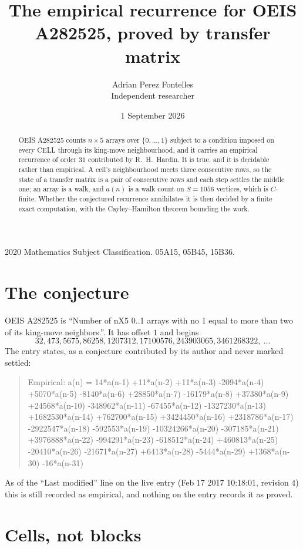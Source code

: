 \documentclass[11pt,a4paper]{article}
\title{The empirical recurrence for OEIS A282525, proved by transfer matrix}
\author{Adrian Perez Fontelles\\ \small Independent researcher}
\date{1 September 2026}
\theoremstyle{plain}
\theoremstyle{definition}
\begin{document}
\maketitle

\begin{abstract}
OEIS A282525 counts $n\times5$ arrays over $\{0,\dots,1\}$ subject to a condition imposed on
every CELL through its king-move neighbourhood, and it carries an empirical recurrence of
order $31$ contributed by R.~H.~Hardin. It is true, and it is decidable rather than
empirical. A cell's neighbourhood meets three consecutive rows, so the state of a transfer
matrix is a pair of consecutive rows and each step settles the middle one; an array is a
walk, and $a(n)$ is a walk count on $S=1056$ vertices, which is $C$-finite. Whether the
conjectured recurrence annihilates it is then decided by a finite exact computation, with the
Cayley--Hamilton theorem bounding the work.
\end{abstract}

\noindent\small 2020 Mathematics Subject Classification. 05A15, 05B45, 15B36.\normalsize

\section{The conjecture}

OEIS A282525 is ``Number of nX5 0..1 arrays with no 1 equal to more than two of its king-move neighbors.''. It has offset $1$ and begins
\[
32, 473, 5675, 86258, 1207312, 17100576, 243903065, 3461268322,\ \dots
\]
The entry states, as a conjecture contributed by its author and never marked settled:
\begin{quote}
Empirical: a(n) = 14*a(n-1) +11*a(n-2) +11*a(n-3) -2094*a(n-4) +5070*a(n-5) -8140*a(n-6) +28850*a(n-7) -16179*a(n-8) +37380*a(n-9) +24568*a(n-10) -348962*a(n-11) -67455*a(n-12) -1327230*a(n-13) +1682530*a(n-14) +762700*a(n-15) +3424450*a(n-16) +2318786*a(n-17) -2922547*a(n-18) -592553*a(n-19) -10324266*a(n-20) -307185*a(n-21) +3976888*a(n-22) -994291*a(n-23) -618512*a(n-24) +460813*a(n-25) -20410*a(n-26) -21671*a(n-27) +6413*a(n-28) -5444*a(n-29) +1368*a(n-30) -16*a(n-31)
\end{quote}
As of the ``Last modified'' line on the live entry (Feb 17 2017 10:18:01, revision 4) this is still
recorded as empirical, and nothing on the entry records it as proved.

\section{Cells, not blocks}
\end{document}
